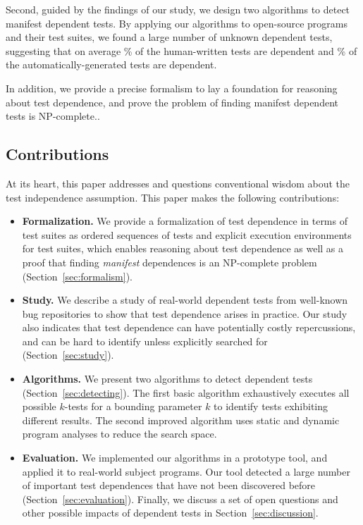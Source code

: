 Second, guided by the findings of our study, we design two algorithms
to detect manifest dependent tests. By applying our algorithms
to  open-source programs and their test suites, we 
found a large number of unknown dependent tests, suggesting
that on average \% of the human-written tests are dependent and
\% of the automatically-generated tests are dependent.


In addition, we provide a precise formalism to lay a foundation for
reasoning about test dependence, and prove the problem of finding
manifest dependent tests is NP-complete..

\subsection{Contributions}

At its heart, this paper addresses and questions
conventional wisdom about the test independence assumption. 
This paper makes the following contributions:

\begin{itemize}
\item \textbf{Formalization.} We provide a formalization of test dependence
  in terms of test suites as ordered sequences of tests and explicit execution
  environments for test suites, which enables reasoning about test dependence
  as well as a proof that finding \emph{manifest} dependences is an NP-complete
  problem (Section~\ref{sec:formalism}).

  \item \textbf{Study.} We describe a study of  real-world
  dependent tests from well-known bug repositories to show that test dependence
  arises in practice. Our study also indicates that test dependence can have
  potentially costly repercussions, and can be hard to identify unless
  explicitly searched for (Section~\ref{sec:study}).

  \item \textbf{Algorithms.} We present two algorithms
  to detect dependent tests (Section~\ref{sec:detecting}). The first
  basic algorithm exhaustively executes all possible $k$-tests for
  a bounding parameter $k$ to identify tests exhibiting different results.
  The second improved algorithm uses static and dynamic program analyses
  to reduce the search space. 

  \item \textbf{Evaluation.} We implemented our algorithms in a prototype
  tool, and applied it to  real-world subject programs. Our
  tool detected a large number of important test dependences that have not
  been discovered before (Section~\ref{sec:evaluation}).
  Finally, we discuss a set of open questions and other possible impacts of dependent
  tests in Section~\ref{sec:discussion}.
\end{itemize}


